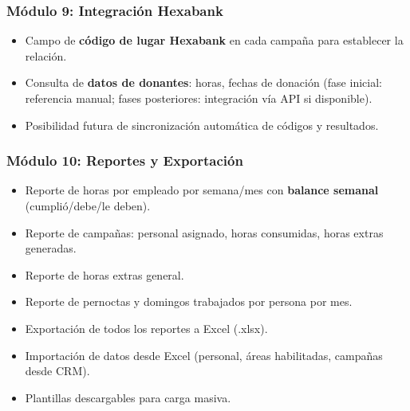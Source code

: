 \documentclass[10pt,a4paper]{article}
\begin{document}
\subsubsection{M\'{o}dulo 9: Integraci\'{o}n Hexabank}
\begin{itemize}[leftmargin=2em]
    \item Campo de \textbf{c\'{o}digo de lugar Hexabank} en cada campaña para establecer la relaci\'{o}n.
    \item Consulta de \textbf{datos de donantes}: horas, fechas de donaci\'{o}n (fase inicial: referencia manual; fases posteriores: integraci\'{o}n v\'{i}a API si disponible).
    \item Posibilidad futura de sincronizaci\'{o}n autom\'{a}tica de c\'{o}digos y resultados.
\end{itemize}

\subsubsection{M\'{o}dulo 10: Reportes y Exportaci\'{o}n}
\begin{itemize}[leftmargin=2em]
    \item Reporte de horas por empleado por semana/mes con \textbf{balance semanal} (cumpli\'{o}/debe/le deben).
    \item Reporte de campañas: personal asignado, horas consumidas, horas extras generadas.
    \item Reporte de horas extras general.
    \item Reporte de pernoctas y domingos trabajados por persona por mes.
    \item Exportaci\'{o}n de todos los reportes a Excel (.xlsx).
    \item Importaci\'{o}n de datos desde Excel (personal, \'{a}reas habilitadas, campañas desde CRM).
    \item Plantillas descargables para carga masiva.
\end{itemize}
\end{document}
